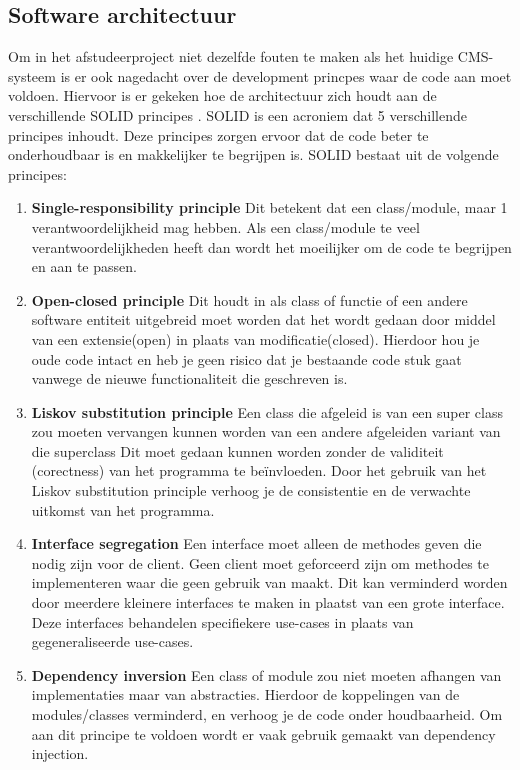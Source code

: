 \subsection{Software architectuur}
\label{subsecion:SoftwareArhitectuur}
Om in het afstudeerproject niet dezelfde fouten te maken als het huidige \gls{CMS}-systeem is er ook nagedacht over de development princpes waar de code aan moet voldoen.
Hiervoor is er gekeken hoe de architectuur zich houdt aan de verschillende SOLID principes \parencite{SOLID}. 
SOLID is een acroniem dat 5 verschillende principes inhoudt.
Deze principes zorgen ervoor dat de code beter te onderhoudbaar is en makkelijker te begrijpen is.
SOLID bestaat uit de volgende principes:

\begin{enumerate}
    \item \textbf{Single-responsibility principle}
    Dit betekent dat een class\slash module, maar 1 verantwoordelijkheid mag hebben.
    Als een class\slash module te veel verantwoordelijkheden heeft dan wordt het moeilijker om de code te begrijpen en aan te passen.

    \item \textbf{Open-closed principle}
    Dit houdt in als class of functie of een andere software entiteit uitgebreid moet worden dat het wordt gedaan door middel van een extensie(open) in plaats van modificatie(closed).
    Hierdoor hou je oude code intact en heb je geen risico dat je bestaande code stuk gaat vanwege de nieuwe functionaliteit die geschreven is. 
        
    \item \textbf{Liskov substitution principle}
    Een class die afgeleid is van een super class zou moeten vervangen kunnen worden van een andere afgeleiden variant van die superclass
    Dit moet gedaan kunnen worden zonder de validiteit (corectness) van het programma te beïnvloeden.
    Door het gebruik van het Liskov substitution principle verhoog je de consistentie en de verwachte uitkomst van het programma.

    \item \textbf{Interface segregation} 
    Een interface moet alleen de methodes geven die nodig zijn voor de client. 
    Geen client moet geforceerd zijn om methodes te implementeren waar die geen gebruik van maakt.
    Dit kan verminderd worden door meerdere kleinere interfaces te maken in plaatst van een grote interface.
    Deze interfaces behandelen specifiekere use-cases in plaats van gegeneraliseerde use-cases.
    \item \textbf{Dependency inversion} 
    Een class of module zou niet moeten afhangen van implementaties maar van abstracties.
    Hierdoor de koppelingen van de modules/classes verminderd, en verhoog je de code onder houdbaarheid.
    Om aan dit principe te voldoen wordt er vaak gebruik gemaakt van dependency injection.
\end{enumerate}

